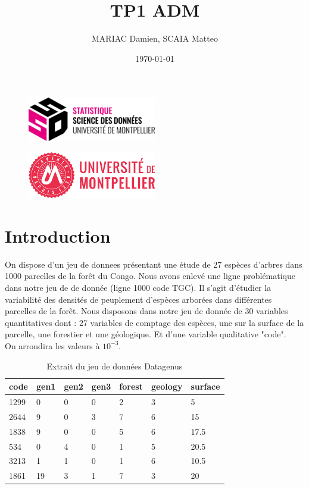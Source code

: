 \documentclass{article}
\title{TP1 ADM}
\author{MARIAC Damien, SCAIA Matteo}
\date{\today}
\begin{document}
\maketitle

\begin{figure}[h] 
    \centering
    \includegraphics[width=0.5\textwidth]{ssd_logo.png} 
\end{figure}

\begin{figure}[h] 
    \centering
    \includegraphics[width=0.5\textwidth]{logo_um_2022_rouge_RVB.png} 
\end{figure}

\newpage
\tableofcontents
\newpage

\section{Introduction}
On dispose d'un jeu de donnees présentant une étude de 27 espèces d'arbres dans 1000 parcelles de la forêt du Congo.
Nous avons enlevé une ligne problématique dans notre jeu de de donnée (ligne 1000 code TGC).
Il s'agit d'étudier la variabilité des densités de peuplement d'espèces arborées dans différentes parcelles de la forêt.
Nous disposons dans notre jeu de donnée de 30 variables quantitatives dont : 27 variables de comptage des espèces, une sur la surface de la parcelle, une forestier et une géologique.
Et d'une variable qualitative "code".
\\
On arrondira les valeurs à $10^{-3}$.

\begin{table}[H]
    \centering
    \begin{tabular}{|l|l|l|l|l|l|l|}
    \hline
    code & gen1 & gen2 & gen3 & forest & geology & surface \\ \hline
    1299 & 0    & 0    & 0    & 2      & 3       & 5       \\ \hline
    2644 & 9    & 0    & 3    & 7      & 6       & 15      \\ \hline
    1838 & 9    & 0    & 0    & 5      & 6       & 17.5    \\ \hline
    534  & 0    & 4    & 0    & 1      & 5       & 20.5    \\ \hline
    3213 & 1    & 1    & 0    & 1      & 6       & 10.5    \\ \hline
    1861 & 19   & 3    & 1    & 7      & 3       & 20      \\ \hline
    \end{tabular}
    \caption{Extrait du jeu de données Datagenus}
\end{table}
\end{document}
